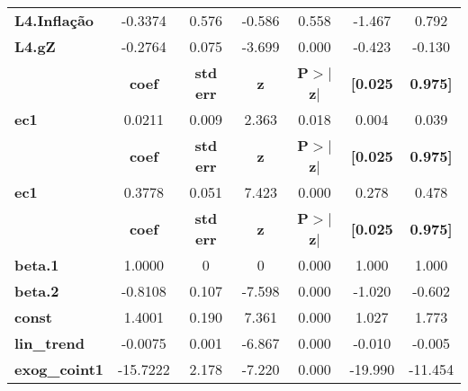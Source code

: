 \begin{center}
\begin{tabular}{lcccccc}
\textbf{L4.Inflação} &      -0.3374  &        0.576     &    -0.586  &         0.558        &       -1.467    &        0.792     \\
\textbf{L4.gZ}       &      -0.2764  &        0.075     &    -3.699  &         0.000        &       -0.423    &       -0.130     \\
             & \textbf{coef} & \textbf{std err} & \textbf{z} & \textbf{P$> |$z$|$} & \textbf{[0.025} & \textbf{0.975]}  \\
\midrule
\textbf{ec1} &       0.0211  &        0.009     &     2.363  &         0.018        &        0.004    &        0.039     \\
             & \textbf{coef} & \textbf{std err} & \textbf{z} & \textbf{P$> |$z$|$} & \textbf{[0.025} & \textbf{0.975]}  \\
\midrule
\textbf{ec1} &       0.3778  &        0.051     &     7.423  &         0.000        &        0.278    &        0.478     \\
                      & \textbf{coef} & \textbf{std err} & \textbf{z} & \textbf{P$> |$z$|$} & \textbf{[0.025} & \textbf{0.975]}  \\
\midrule
\textbf{beta.1}       &       1.0000  &            0     &         0  &         0.000        &        1.000    &        1.000     \\
\textbf{beta.2}       &      -0.8108  &        0.107     &    -7.598  &         0.000        &       -1.020    &       -0.602     \\
\textbf{const}        &       1.4001  &        0.190     &     7.361  &         0.000        &        1.027    &        1.773     \\
\textbf{lin\_trend}   &      -0.0075  &        0.001     &    -6.867  &         0.000        &       -0.010    &       -0.005     \\
\textbf{exog\_coint1} &     -15.7222  &        2.178     &    -7.220  &         0.000        &      -19.990    &      -11.454     \\
\bottomrule
\end{tabular}
\end{center}